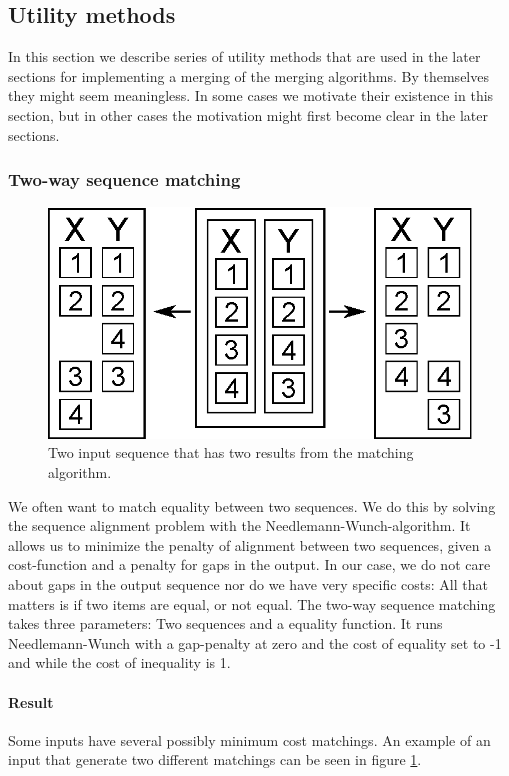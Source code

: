 \documentclass[11pt]{article}
\begin{document}
\subsection{Utility methods}
In this section we describe series of utility methods that are used in the later sections for implementing a merging of the merging algorithms. By themselves they might seem meaningless. In some cases we motivate their existence in this section, but in other cases the motivation might first become clear in the later sections.

\subsubsection{Two-way sequence matching}
\begin{figure}
   \centerline{\includegraphics[scale=0.4]{drawings/eps/mincostsequencematchingambigious.eps}}
   \caption{Two input sequence that has two results from the matching algorithm.}
   \label{TwoWayMatchingAmbigiouty}
\end{figure}

We often want to match equality between two sequences. We do this by solving the sequence alignment problem with the Needlemann-Wunch-algorithm. It allows us to minimize the penalty of alignment between two sequences, given a cost-function and a penalty for gaps in the output. In our case, we do not care about gaps in the output sequence nor do we have very specific costs: All that matters is if two items are equal, or not equal. The two-way sequence matching takes three parameters: Two sequences and a equality function. It runs Needlemann-Wunch with a gap-penalty at zero and the cost of equality set to -1 and while the cost of inequality is 1.

\paragraph{Result} Some inputs have several possibly minimum cost matchings. An example of an input that generate two different matchings can be seen in figure \ref{TwoWayMatchingAmbigiouty}.
\end{document}
